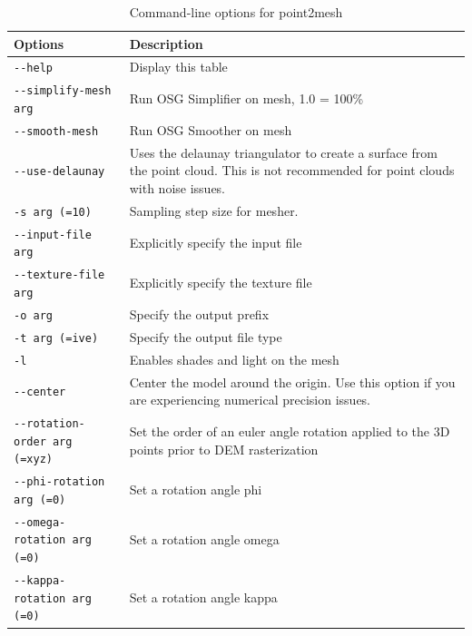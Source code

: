 \begin{longtable}{|l|p{10cm}|}
\caption{Command-line options for point2mesh}
\label{tbl:point2mesh}
\endfirsthead
\endhead
\endfoot
\endlastfoot
\hline
Options & Description \\ \hline \hline
\verb#--help# & Display this table \\ \hline
\verb#--simplify-mesh arg# & Run OSG Simplifier on mesh, 1.0 = 100\% \\ \hline
\verb#--smooth-mesh# & Run OSG Smoother on mesh \\ \hline
\verb#--use-delaunay# & Uses the delaunay triangulator to create a surface from the point cloud. This is not recommended for point clouds with noise issues. \\ \hline
\verb#-s arg (=10)# & Sampling step size for mesher. \\ \hline
\verb#--input-file arg# & Explicitly specify the input file \\ \hline
\verb#--texture-file arg# & Explicitly specify the texture file \\ \hline
\verb#-o arg# & Specify the output prefix \\ \hline
\verb#-t arg (=ive)# & Specify the output file type \\ \hline
\verb#-l# & Enables shades and light on the mesh \\ \hline
\verb#--center# & Center the model around the origin. Use this option if you are experiencing numerical precision issues. \\ \hline
\verb#--rotation-order arg (=xyz)# & Set the order of an euler angle rotation applied to the 3D points prior to DEM rasterization \\ \hline
\verb#--phi-rotation arg (=0)# & Set a rotation angle phi \\ \hline
\verb#--omega-rotation arg (=0)# & Set a rotation angle omega \\ \hline
\verb#--kappa-rotation arg (=0)# & Set a rotation angle kappa \\ \hline
\end{longtable}




